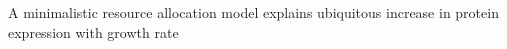A minimalistic resource allocation model explains ubiquitous increase in protein expression with growth rate